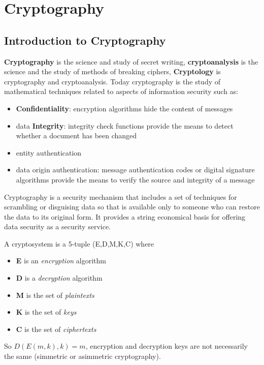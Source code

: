 \section{Cryptography}
    \subsection{Introduction to Cryptography}
    \textbf{Cryptography} is the science and study of secret writing, \textbf{cryptoanalysis} is the science and the study of methods of breaking ciphers, \textbf{Cryptology} is cryptography and cryptoanalysis. Today cryptography is the study of mathematical techniques related to aspects of information security such as:
    \begin{itemize}
        \item \textbf{Confidentiality}: encryption algorithms hide the content of messages
        \item data \textbf{Integrity}: integrity check functions provide the means to detect whether a document has been changed
        \item entity authentication 
        \item data origin authentication: message authentication codes or digital signature algorithms provide the means to verify the source and integrity of a message
    \end{itemize}
    Cryptography is a security mechanism that includes a set of techniques for scrambling or disguising data so that is available only to someone who can restore the data to its original form. It provides a string economical basis for offering data security as a security service.
    
    A cryptosystem is a 5-tuple (E,D,M,K,C) where
    \begin{itemize}
        \item \textbf{E} is an \textit{encryption} algorithm
        \item \textbf{D} is a \textit{decryption} algorithm
        \item \textbf{M} is the set of \textit{plaintexts}
        \item \textbf{K} is the set of \textit{keys} 
        \item \textbf{C} is the set of \textit{ciphertexts}
    \end{itemize}
    
    So $D(E(m,k),k)=m$, encryption and decryption keys are not necessarily the same (simmetric or asimmetric cryptography).
    
